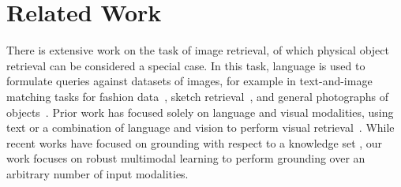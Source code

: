 \documentclass[10pt]{article} %
\newcommand{\todokdinline}[1]{\todo[color=red!20,inline]{{KD: \small #1}}}
\newcommand{\todocmi}[1]{\todo[inline,color=green!40]{\small #1 -- Cynthia}}
\newcommand{\todoffinline}[1]{\todo[inline,color=blue!20]{\small #1 -- Frank}}
\begin{document}



\section{Related Work}
\label{sec:Related-Work}



There is extensive work on the task of image retrieval, of which physical object retrieval can be considered a special case. In this task, language is used to formulate queries against datasets of images, for example in text-and-image matching tasks for fashion data~\citep{gao2020fashionbert, wen2021comprehensive}, sketch retrieval~\citep{huang2017deep}, and general photographs of objects~\citep{ma2020large, novak2015large, hong2021gilbert}. Prior work has focused solely on language and visual modalities, using text or a combination of language and vision to perform visual retrieval~\citep{vo2019composing}. While recent works have focused on grounding with respect to a knowledge set \citep{10.1145/3357384.3357889,10.1145/3397271.3401097}, our work focuses on robust multimodal learning to perform grounding over an arbitrary number of input modalities. 
\end{document}
